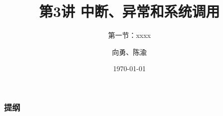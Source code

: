 


\title[第3讲]{第3讲 中断、异常和系统调用} %
\subtitle{第一节：xxxx}
\author{向勇、陈渝} %
\date{\today} %



\begin{frame}
\titlepage %
\end{frame}
\begin{frame}
\frametitle{提纲} %
\tableofcontents %
\end{frame}

